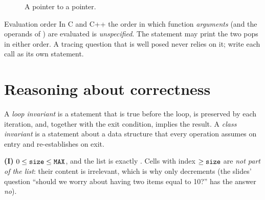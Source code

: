 \begin{figure}[ht]\centering
{}
\caption{A pointer to a pointer.}
\end{figure}

\begin{note}{Evaluation order}
In C and C++ the order in which function \emph{arguments} (and the operands of \cc{+}) are
evaluated is \emph{unspecified}. The statement
 may print the two pops in either order. A
tracing question that is well posed never relies on it; write each call as its own
statement.
\end{note}

\section{Reasoning about correctness}

\begin{definition}[Invariant]
A \emph{loop invariant} is a statement that is true before the loop, is preserved by each
iteration, and, together with the exit condition, implies the result. A \emph{class
invariant} is a statement about a data structure that every operation assumes on entry
and re-establishes on exit.
\end{definition}

\begin{example}\label{ex:alinv}
\textbf{(I)} $0\le\texttt{size}\le\texttt{MAX}$, and the list is exactly
. Cells with index $\ge\texttt{size}$ are \emph{not part of the list}:
their content is irrelevant, which is why  only decrements  (the
slides' question ``should we worry about having two items equal to 10?'' has the
answer \emph{no}).
\end{example}

